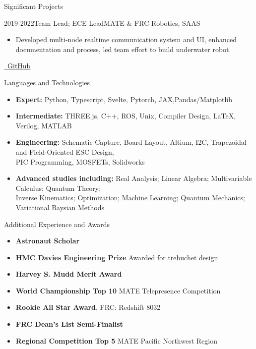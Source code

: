 \documentclass[]{mcdowellcv}
\begin{document}
\begin{cvsection}{Significant Projects}
\begin{cvsubsection}{2019-2022}{Team Lead; ECE Lead}{MATE \& FRC Robotics, SAAS}
\begin{itemize}
			\item Developed multi-node realtime communication system and UI, enhanced documentation and process, led team effort to build underwater robot.
		\end{itemize}
		\href{https://github.com/redshiftrobotics/}{\faGithub \ GitHub}
	\end{cvsubsection}
\end{cvsection}

\begin{cvsection}{Languages and Technologies}
	\begin{cvsubsection}{}{}{}
		\begin{itemize}
			\item \textbf{Expert:} Python, Typescript, Svelte, Pytorch, JAX,Pandas/Matplotlib
			\item \textbf{Intermediate:} THREE.js, C++, ROS, Unix, Compiler Design, LaTeX, Verilog, MATLAB
			\item \textbf{Engineering:} Schematic Capture, Board Layout, Altium, I2C,
			      Trapezoidal and Field-Oriented ESC Design, \\ PIC Programming, MOSFETs, Solidworks
			\item \textbf{Advanced studies including:} Real Analysis; Linear Algebra; Multivariable Calculus; Quantum Theory; \\ Inverse Kinematics; Optimization; Machine Learning; Quantum Mechanics; Variational Baysian Methods
		\end{itemize}
	\end{cvsubsection}
\end{cvsection}

\begin{cvsection}{Additional Experience and Awards}
	\begin{cvsubsection}{}{}{}
		\begin{itemize}
			\item[2024] \textbf{Astronaut Scholar}
			\item[2023] \textbf{HMC Davies Engineering Prize} Awarded for \hyperlink{trebuchet_design}{trebuchet design}
			\item[2022] \textbf{Harvey S. Mudd Merit Award}
			\item[2021] \textbf{World Championship Top 10} MATE  Telepresence Competition
			\item[2020] \textbf{Rookie All Star Award}, FRC: Redshift 8032
			\item[2020] \textbf{FRC Dean's List Semi-Finalist}
			\item[2018] \textbf{Regional Competition Top 5} MATE Pacific Northwest Region
		\end{itemize}
	\end{cvsubsection}
\end{cvsection}
\end{document}
